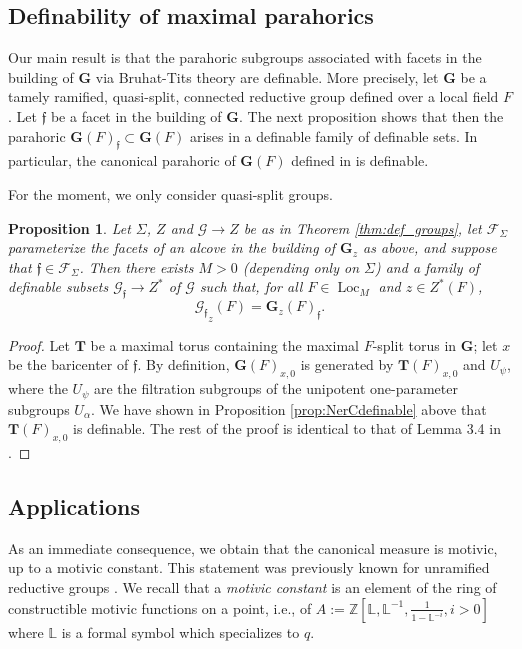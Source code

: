 \documentclass{amsart}
\newcommand{\Z}{{\mathbb Z}}
\newcommand{\cF}{\mathcal{F}}
\newcommand{\cG}{\mathcal{G}}
\DeclareMathOperator{\loc}{Loc}
\newcommand{\bG}{\mathbf{G}}
\newcommand{\bT}{\mathbf {T}}
\newcommand{\ff}{{\mathfrak f}}
\newcommand\lef{\mathbb L}
\theoremstyle{plain}
\newtheorem{prop}[thm]{Proposition}
\theoremstyle{definition}
\begin{document}
\subsection{Definability of maximal parahorics} 
Our main result is that the parahoric subgroups associated with facets in the building of $\bG$ via Bruhat-Tits theory are definable.
More precisely, let $\bG$ be a tamely ramified, quasi-split, connected reductive group defined over a local field $F$.
Let $\ff$ be a facet in the building of $\bG$.  The next proposition shows that
then the parahoric $\bG(F)_\ff\subset \bG(F)$ arises in a definable family of definable sets. 
In particular, the canonical parahoric of $\bG(F)$ defined in \cite{gross:motive} is definable. 

For the moment, we only consider quasi-split groups. 

\begin{prop}\label{prop:main}
 Let $\Sigma$, $Z$ and $\cG\to Z$ be as in Theorem \ref{thm:def_groups}, let 
 $\cF_{\Sigma}$ parameterize the facets of an alcove in the building of $\bG_z$ as above,
 and suppose that $\ff \in \cF_\Sigma$.  
Then there exists $M>0$ (depending only on $\Sigma$) and a family of definable subsets $\cG_{\ff} \to Z^\ast$ of $\cG$
 such that, for all $F\in \loc_M$ and $z\in Z^\ast(F)$, 
\[
{\cG_{\ff}}_{z}(F)= \bG_z(F)_{\ff}.
\]
\end{prop}

\begin{proof} Let $\bT$ be a maximal torus containing the maximal $F$-split torus in $\bG$; let $x$ be the baricenter of $\ff$.
By definition, $\bG(F)_{x,0}$ is generated by $\bT(F)_{x, 0}$ and $U_\psi$, where the $U_\psi$ are
the filtration subgroups of the unipotent one-parameter subgroups $U_{\alpha}$. 
We have shown in Proposition \ref{prop:NerCdefinable} above that  $\bT(F)_{x, 0}$ is definable.
The rest of the proof is identical to that of Lemma 3.4 in \cite{CGH-2}.  
\end{proof} 

\subsection{Applications} 
As an immediate consequence, we obtain that the canonical measure is motivic, up to a motivic constant.
This statement was previously known for unramified reductive groups \cite{cluckers-hales-loeser}.
We recall that a \emph{motivic constant} is an element of the ring of constructible motivic functions on a point,
i.e., of $A:=\Z[\lef, \lef^{-1}, \frac{1}{1-\lef^{-i}}, i>0]$ where $\lef$ is a formal symbol which specializes to $q$.
\end{document}
